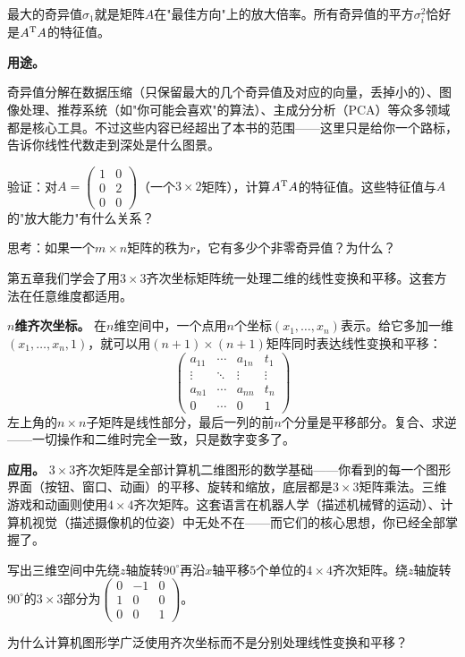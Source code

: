 最大的奇异值$\sigma_1$就是矩阵$A$在"最佳方向"上的放大倍率。所有奇异值的平方$\sigma_i^2$恰好是$A^{\text T}A$的特征值。

\textbf{用途。}

奇异值分解在数据压缩（只保留最大的几个奇异值及对应的向量，丢掉小的）、图像处理、推荐系统（如"你可能会喜欢"的算法）、主成分分析（PCA）等众多领域都是核心工具。不过这些内容已经超出了本书的范围——这里只是给你一个路标，告诉你线性代数走到深处是什么图景。

\begin{exercise}
\item 验证：对$A=\begin{pmatrix}1&0\\0&2\\0&0\end{pmatrix}$（一个$3\times2$矩阵），计算$A^{\text T}A$的特征值。这些特征值与$A$的"放大能力"有什么关系？
\item 思考：如果一个$m\times n$矩阵的秩为$r$，它有多少个非零奇异值？为什么？
\end{exercise}


第五章我们学会了用$3\times3$齐次坐标矩阵统一处理二维的线性变换和平移。这套方法在任意维度都适用。

\textbf{$n$维齐次坐标。} 在$n$维空间中，一个点用$n$个坐标$(x_1,\ldots,x_n)$表示。给它多加一维$(x_1,\ldots,x_n,1)$，就可以用$(n+1)\times(n+1)$矩阵同时表达线性变换和平移：
\[
\begin{pmatrix}
a_{11}&\cdots&a_{1n}&t_1\\
\vdots&\ddots&\vdots&\vdots\\
a_{n1}&\cdots&a_{nn}&t_n\\
0&\cdots&0&1
\end{pmatrix}
\]
左上角的$n\times n$子矩阵是线性部分，最后一列的前$n$个分量是平移部分。复合、求逆——一切操作和二维时完全一致，只是数字变多了。

\textbf{应用。} $3\times3$齐次矩阵是全部计算机二维图形的数学基础——你看到的每一个图形界面（按钮、窗口、动画）的平移、旋转和缩放，底层都是$3\times3$矩阵乘法。三维游戏和动画则使用$4\times4$齐次矩阵。这套语言在机器人学（描述机械臂的运动）、计算机视觉（描述摄像机的位姿）中无处不在——而它们的核心思想，你已经全部掌握了。

\begin{exercise}
\item 写出三维空间中先绕$z$轴旋转$90^\circ$再沿$x$轴平移$5$个单位的$4\times4$齐次矩阵。绕$z$轴旋转$90^\circ$的$3\times3$部分为$\begin{pmatrix}0&-1&0\\1&0&0\\0&0&1\end{pmatrix}$。
\item 为什么计算机图形学广泛使用齐次坐标而不是分别处理线性变换和平移？
\end{exercise}

